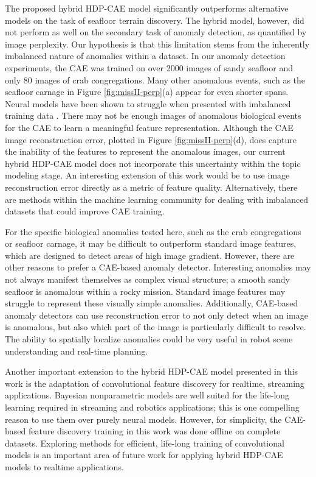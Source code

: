 \documentclass[letterpaper, 10 pt, conference]{ieeeconf}
\begin{document}
The proposed hybrid HDP-CAE model significantly outperforms alternative models on the task of seafloor terrain discovery. The hybrid model, however, did not perform as well on the secondary task of anomaly detection, as quantified by image perplexity. Our hypothesis is that this limitation stems from the inherently imbalanced nature of anomalies within a dataset. In our anomaly detection experiments, the CAE was trained on over 2000 images of sandy seafloor and only 80 images of crab congregations. Many other anomalous events, such as the seafloor carnage in Figure \ref{fig:missII-perp}(a) appear for even shorter spans. Neural models have been shown to struggle when presented with imbalanced training data \cite{Chawla}. There may not be enough images of anomalous biological events for the CAE to learn a meaningful feature representation. Although the CAE image reconstruction error, plotted in Figure \ref{fig:missII-perp}(d), does capture the inability of the features to represent the anomalous images, our current hybrid HDP-CAE model does not incorporate this uncertainty within the topic modeling stage. An interesting extension of this work would be to use image reconstruction error directly as a metric of feature quality. Alternatively, there are methods within the machine learning community for dealing with imbalanced datasets that could improve CAE training. 

For the specific biological anomalies tested here, such as the crab congregations or seafloor carnage, it may be difficult to outperform standard image features, which are designed to detect areas of high image gradient. However, there are other reasons to prefer a CAE-based anomaly detector. Interesting anomalies may not always manifest themselves as complex visual structure; a smooth sandy seafloor is anomalous within a rocky mission. Standard image features may struggle to represent these visually simple anomalies. Additionally, CAE-based anomaly detectors can use reconstruction error to not only detect when an image is anomalous, but also which part of the image is particularly difficult to resolve. The ability to spatially localize anomalies could be very useful in robot scene understanding and real-time planning.

Another important extension to the hybrid HDP-CAE model presented in this work is the adaptation of convolutional feature discovery for realtime, streaming applications. Bayesian nonparametric models are well suited for the life-long learning required in streaming and robotics applications; this is one compelling reason to use them over purely neural models. However, for simplicity, the CAE-based feature discovery training in this work was done offline on complete datasets. Exploring methods for efficient, life-long training of convolutional models is an important area of future work for applying hybrid HDP-CAE models to realtime applications.
 
\end{document}
